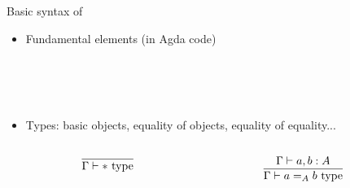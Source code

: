 \documentclass[12pt, mathserif,handout]{beamer}
\begin{document}
\begin{frame}[c]{Basic syntax of \tig}


\begin{itemize}

\item Fundamental elements (in Agda code)

\begin{code}\>\<
\\
\>  \<[19]%
\>[19]\AgdaSymbol{:} \<%
\\
\>  \AgdaSymbol{(} \AgdaSymbol{:} \AgdaSymbol{)} \<[19]%
\>[19]\AgdaSymbol{:} \<%
\\
\>  \<[19]%
\>[19]\AgdaSymbol{:} \AgdaSymbol{\{} \AgdaSymbol{:} \AgdaSymbol{\}(} \AgdaSymbol{:}  \AgdaSymbol{)}  \<%
\>\<\end{code}


\item Types: basic objects, equality of objects, equality of equality...

\begin{columns}[onlytextwidth]
 
    \begin{column}{0.4\textwidth}


\begin{equation*}
\infer{\Gamma \vdash * ~ \text{type}}
{} 
\end{equation*}

    \end{column}
   \begin{column}{0.4\textwidth}

\begin{equation*}
\infer{\Gamma \vdash a =_{A} b ~\text{type}}
{\Gamma \vdash a, b : A}
\end{equation*}

    \end{column}
​  \end{columns}



\end{itemize}
\end{frame}
\end{document}
